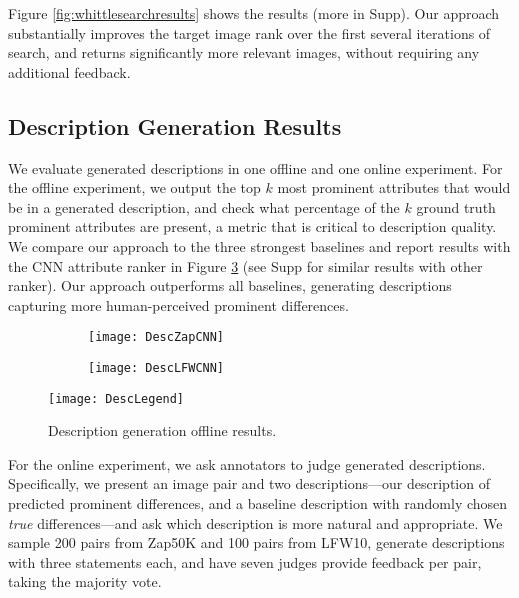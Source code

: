 \documentclass[10pt,twocolumn,letterpaper]{article}
\begin{document}
Figure \ref{fig:whittlesearchresults} shows the results (more in Supp). Our approach substantially improves the target image rank over the first several iterations of search, and returns significantly more relevant images, without requiring any additional feedback.


\subsection{Description Generation Results} \label{descriptionresults}

We evaluate generated descriptions in one offline and one online experiment. For the offline experiment, we output the top $k$ most prominent attributes that would be in a generated description, and check what percentage of the $k$ ground truth prominent attributes are present, a metric that is critical to description quality. We compare our approach to the three strongest baselines and report results with the CNN attribute ranker in Figure \ref{fig:desc} (see Supp for similar results with other ranker). Our approach outperforms all baselines, generating descriptions capturing more human-perceived prominent differences. 

\begin{figure}[t]
    \centering
    \begin{subfigure}[c]{0.46\linewidth}
        \centering
        \texttt{[image: DescZapCNN]}
        \label{fig:desczapsvm}
    \end{subfigure}
    \hfill
    \begin{subfigure}[c]{0.46\linewidth}
        \centering
        \texttt{[image: DescLFWCNN]}
        \label{fig:desczapcnn}
    \end{subfigure}
    
    \vspace{-0.2cm}
    
    \texttt{[image: DescLegend]}
    
    \caption[Description Generation Accuracy]{Description generation offline results.}
    \label{fig:desc}
\end{figure}

For the online experiment, we ask annotators to judge generated descriptions. Specifically, we present an image pair and two descriptions---our description of predicted prominent differences, and a baseline description with randomly chosen \textit{true} differences---and ask which description is more natural and appropriate. We sample 200 pairs from Zap50K and 100 pairs from LFW10, generate descriptions with three statements each, and have seven judges provide feedback per pair, taking the majority vote.
\end{document}
